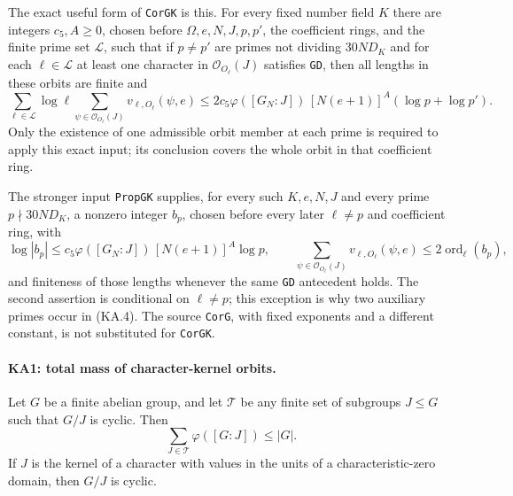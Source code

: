 The exact useful form of \texttt{CorGK} is this.  For every fixed
number field $K$ there are integers $c_5,A\ge0$, chosen before
$\Omega,e,N,J,p,p'$, the coefficient rings, and the finite prime
set $\mathcal L$, such that if $p\ne p'$ are primes not dividing
$30ND_K$ and for each $\ell\in\mathcal L$ at least one character in
$\mathcal O_{O_\ell}(J)$ satisfies \texttt{GD}, then all lengths
in these orbits are finite and
\[
 \sum_{\ell\in\mathcal L}\log\ell
       \sum_{\psi\in\mathcal O_{O_\ell}(J)}v_{\ell,O_\ell}(\psi,e)
 \le 2c_5\varphi([G_N:J])\,[N(e+1)]^A
                      (\log p+\log p').
 \tag{KA.4}
\]
Only the existence of one admissible orbit member at each prime is
required to apply this exact input; its conclusion covers the whole
orbit in that coefficient ring.

The stronger input \texttt{PropGK} supplies, for every such
$K,e,N,J$ and every prime $p\nmid30ND_K$, a nonzero integer $b_p$,
chosen before every later $\ell\ne p$ and coefficient ring, with
\[
 \log|b_p|\le c_5\varphi([G_N:J])\,[N(e+1)]^A\log p,
 \qquad
 \sum_{\psi\in\mathcal O_{O_\ell}(J)}v_{\ell,O_\ell}(\psi,e)
       \le 2\operatorname{ord}_{\ell}(b_p),
 \tag{KA.5}
\]
and finiteness of those lengths whenever the same \texttt{GD}
antecedent holds.  The second assertion is conditional on
$\ell\ne p$; this exception is why two auxiliary primes occur in
(KA.4).  The source \texttt{CorG}, with fixed exponents and a
different constant, is not substituted for \texttt{CorGK}.

\paragraph{KA1: total mass of character-kernel orbits.}
\label{claim:KA1}
Let $G$ be a finite abelian group, and let $\mathcal T$ be any
finite set of subgroups $J\le G$ such that $G/J$ is cyclic.  Then
\[
       \sum_{J\in\mathcal T}\varphi([G:J])\le |G|.
 \tag{KA.6}
\]
If $J$ is the kernel of a character with values in the units of a
characteristic-zero domain, then $G/J$ is cyclic.

